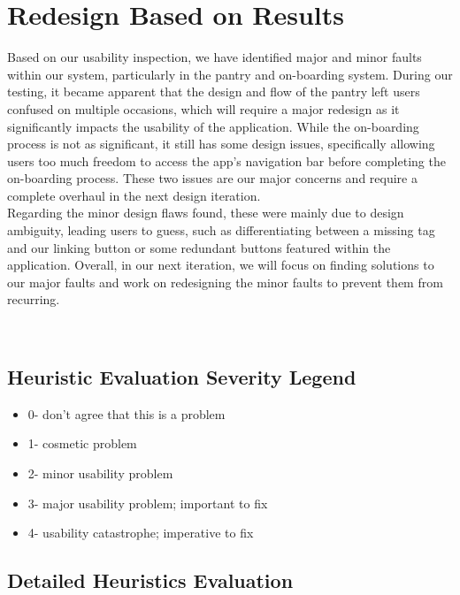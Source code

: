 \documentclass[manuscript, screen, nonacm]{acmart}
\begin{document}
\section{Redesign Based on Results}
Based on our usability inspection, we have identified major and minor faults within our system, particularly in the pantry and on-boarding system. During our testing, it became apparent that the design and flow of the pantry left users confused on multiple occasions, which will require a major redesign as it significantly impacts the usability of the application. While the on-boarding process is not as significant, it still has some design issues, specifically allowing users too much freedom to access the app's navigation bar before completing the on-boarding process. These two issues are our major concerns and require a complete overhaul in the next design iteration.\\
Regarding the minor design flaws found, these were mainly due to design ambiguity, leading users to guess, such as differentiating between a missing tag and our linking button or some redundant buttons featured within the application. Overall, in our next iteration, we will focus on finding solutions to our major faults and work on redesigning the minor faults to prevent them from recurring.

\newpage
\









\subsection{Heuristic Evaluation Severity Legend}
\begin{itemize}
    \item 0- don’t agree that this is a problem
    \item 1- cosmetic problem
    \item 2- minor usability problem
    \item 3- major usability problem; important to fix
    \item 4- usability catastrophe; imperative to fix  
\end{itemize}

\newpage
\subsection{Detailed Heuristics Evaluation}
\end{document}
